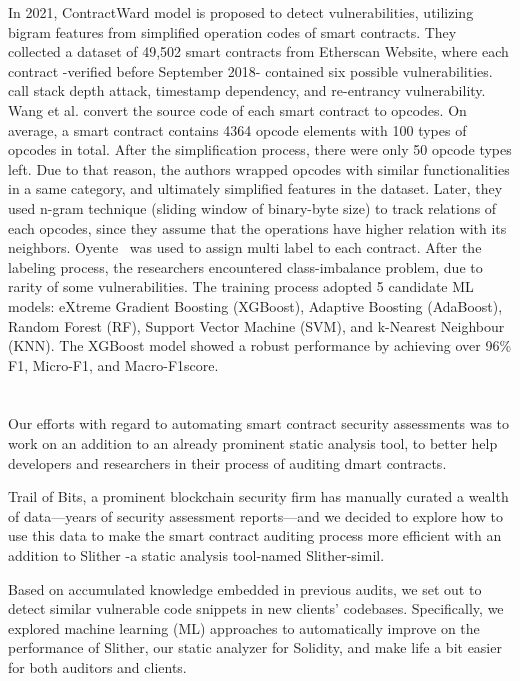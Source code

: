 In 2021, ContractWard model is proposed to detect vulnerabilities, utilizing bigram features from simplified operation codes of smart contracts.
They collected a dataset of 49,502 smart contracts from Etherscan Website, where each contract -verified before September 2018- contained six possible vulnerabilities.
call stack depth attack, timestamp dependency, and re-entrancy vulnerability.
Wang et al. convert the source code of each smart contract to opcodes.
On average, a smart contract contains 4364 opcode elements with 100 types of opcodes in total.
After the simplification process, there were only 50 opcode types left.
Due to that reason, the authors wrapped opcodes with similar functionalities in a same category, and ultimately simplified features in the dataset.
Later, they used n-gram technique (sliding window of binary-byte size) to track relations of each opcodes, since they assume that the operations have higher relation with its neighbors.
Oyente~\cite{oyente} was used to assign multi label to each contract.
After the labeling process, the researchers encountered class-imbalance problem, due to rarity of some vulnerabilities.
The training process adopted 5 candidate ML models: eXtreme Gradient Boosting (XGBoost), Adaptive Boosting (AdaBoost), Random Forest (RF), Support Vector Machine (SVM), and k-Nearest Neighbour (KNN).
The XGBoost model showed a robust performance by achieving over 96\% F1, Micro-F1, and Macro-F1score.

\section{\slithersimil}
Our efforts with regard to automating smart contract security assessments was to work on an addition to an already prominent static analysis tool, to better help developers and researchers in
their process of auditing dmart contracts.

Trail of Bits, a prominent blockchain security firm has manually curated a wealth of data—years of security assessment reports—and we decided to explore how to use this data to make the smart
contract auditing process more efficient with an addition to Slither -a static analysis tool-named Slither-simil.

Based on accumulated knowledge embedded in previous audits, we set out to detect similar vulnerable code snippets in new clients' codebases. Specifically, we explored machine learning (ML)
approaches to automatically improve on the performance of Slither, our static analyzer for Solidity, and make life a bit easier for both auditors and clients.

